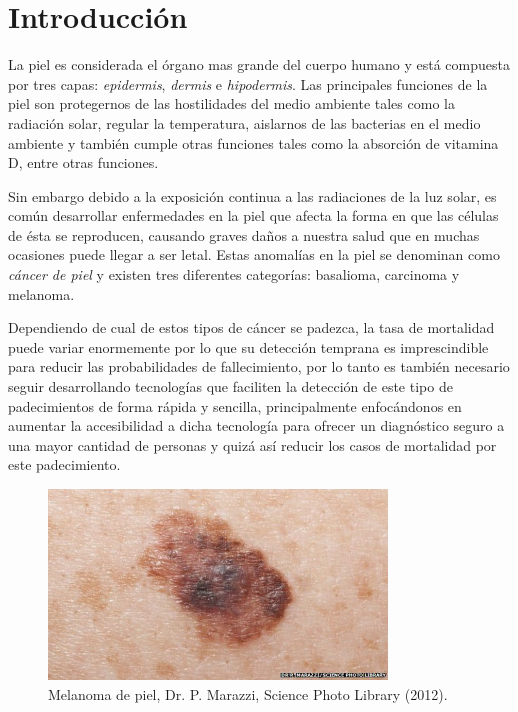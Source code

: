 
\chapter{Introducción}

La piel es considerada el órgano mas grande del cuerpo humano y está compuesta por tres capas: \emph{\gls{epidermis}}, \emph{\gls{dermis}} e \emph{\gls{hipodermis}}. Las principales funciones de la piel son protegernos de las hostilidades del medio ambiente tales como la radiación solar,  regular la temperatura, aislarnos de las bacterias en el medio ambiente y también cumple otras funciones tales como la absorción de vitamina D, entre otras funciones.

Sin embargo debido a la exposición continua a las radiaciones de la luz solar, es común desarrollar enfermedades en la piel que afecta la forma en que las células de ésta se reproducen, causando graves daños a nuestra salud que en muchas ocasiones puede llegar a ser letal. Estas anomalías en la piel se denominan como \emph{cáncer de piel} y existen tres diferentes categorías: basalioma, carcinoma y melanoma.

Dependiendo de cual de estos tipos de cáncer se padezca, la tasa de mortalidad puede variar enormemente por lo que su detección temprana es imprescindible para reducir las probabilidades de fallecimiento, por lo tanto es también necesario seguir desarrollando tecnologías que faciliten la detección de este tipo de padecimientos de forma rápida y sencilla, principalmente enfocándonos en aumentar la accesibilidad a dicha tecnología para ofrecer un diagnóstico seguro a una mayor cantidad de personas y quizá así reducir los casos de mortalidad por este padecimiento.


\begin{figure}[h!]
    \includegraphics[width=90mm, scale = 0.8]{Figuras/skin_cancer_bbc.jpg}
    \centering
    \caption{Melanoma de piel, Dr. P. Marazzi, Science Photo Library (2012).}
    \label{fig:can_jpg}
\end{figure}


